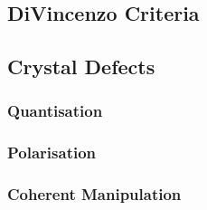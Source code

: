 \subsection{DiVincenzo Criteria}
\cite{RevModPhys.89.035002}
\cite{Crawford2021}

\subsection{Crystal Defects}

\cite{Kraus2014}

\cite{Kanai2022}

\subsubsection{Quantisation}
\subsubsection{Polarisation}
\cite{PhysRevLett.112.087601}

\subsubsection{Coherent Manipulation}
\cite{Widmann2014}

\cite{PhysRevB.105.165108}

